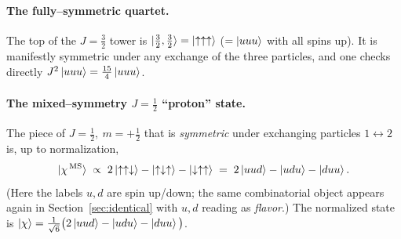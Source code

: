 \documentclass[11pt,oneside]{article}
\newcommand{\up}{\uparrow}
\newcommand{\down}{\downarrow}
\begin{document}
\paragraph{The fully--symmetric quartet.}
The top of the $J=\tfrac32$ tower is $\ket{\tfrac32,\tfrac32}=\ket{\up\up\up}$
($=\ket{uuu}$ with all spins up). It is manifestly symmetric under any exchange
of the three particles, and one checks directly $J^2\ket{uuu}=\tfrac{15}{4}\ket{uuu}$.

\paragraph{The mixed--symmetry $J=\tfrac12$ ``proton'' state.}
The piece of $J=\tfrac12,\ m=+\tfrac12$ that is \emph{symmetric} under
exchanging particles $1\!\leftrightarrow\!2$ is, up to normalization,
\begin{equation}
  \ket{\chi^{\,\mathrm{MS}}}
   \;\propto\; 2\ket{\up\up\down} - \ket{\up\down\up} - \ket{\down\up\up}
   \;=\; 2\ket{uud} - \ket{udu} - \ket{duu}.
  \label{eq:protonstate}
\end{equation}
(Here the labels $u,d$ are spin up/down; the same combinatorial object appears
again in Section~\ref{sec:identical} with $u,d$ reading as \emph{flavor}.) The
normalized state is $\ket{\chi}=\tfrac{1}{\sqrt6}\big(2\ket{uud}-\ket{udu}-\ket{duu}\big)$.
\end{document}
